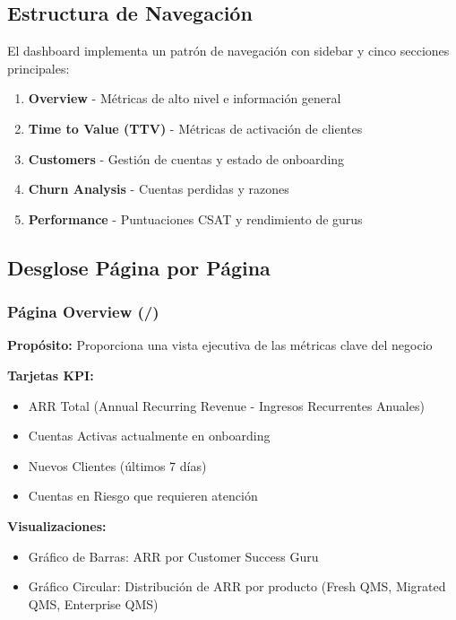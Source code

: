\documentclass[12pt,a4paper]{article}
\begin{document}
\subsection{Estructura de Navegación}

El dashboard implementa un patrón de navegación con sidebar y cinco secciones principales:

\begin{enumerate}
    \item \textbf{Overview} - Métricas de alto nivel e información general
    \item \textbf{Time to Value (TTV)} - Métricas de activación de clientes
    \item \textbf{Customers} - Gestión de cuentas y estado de onboarding
    \item \textbf{Churn Analysis} - Cuentas perdidas y razones
    \item \textbf{Performance} - Puntuaciones CSAT y rendimiento de gurus
\end{enumerate}

\subsection{Desglose Página por Página}

\subsubsection{Página Overview (/)}

\textbf{Propósito:} Proporciona una vista ejecutiva de las métricas clave del negocio

\textbf{Tarjetas KPI:}
\begin{itemize}
    \item ARR Total (Annual Recurring Revenue - Ingresos Recurrentes Anuales)
    \item Cuentas Activas actualmente en onboarding
    \item Nuevos Clientes (últimos 7 días)
    \item Cuentas en Riesgo que requieren atención
\end{itemize}

\textbf{Visualizaciones:}
\begin{itemize}
    \item Gráfico de Barras: ARR por Customer Success Guru
    \item Gráfico Circular: Distribución de ARR por producto (Fresh QMS, Migrated QMS, Enterprise QMS)
\end{itemize}
\end{document}
